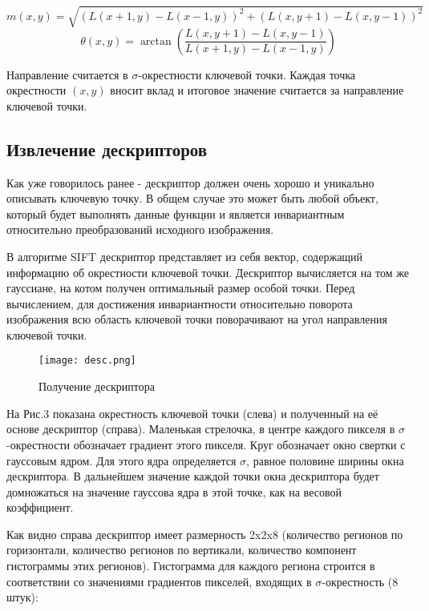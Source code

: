 \begin{equation}
    m(x,y)=\sqrt{(L(x+1,y) - L(x-1,y))^2 + (L(x,y+1) - L(x,y-1))^2}
\end{equation}
\begin{equation}
    \theta(x,y)=\arctan{\left(\frac{L(x,y+1) - L(x,y-1)}{L(x+1,y) - L(x-1,y)}\right)}
\end{equation}

Направление считается в $\sigma$-окрестности ключевой точки.  Каждая точка окрестности $(x, y)$ вносит вклад и итоговое значение считается за направление ключевой точки.

\subsection{Извлечение дескрипторов}

Как уже говорилось ранее - дескриптор должен очень хорошо и уникально описывать ключевую точку. В общем случае это может быть любой объект, который будет выполнять данные функции и является инвариантным относительно преобразований исходного изображения.

В алгоритме SIFT дескриптор представляет из себя вектор, содержащий информацию об окрестности ключевой точки. Дескриптор вычисляется на том же гауссиане, на котом получен оптимальный размер особой точки. Перед вычислением, для достижения инвариантности относительно поворота изображения всю область ключевой точки поворачивают на угол направления ключевой точки.

\begin{figure}[h]
    \centering
    \texttt{[image: desc.png]}
    \caption{Получение дескриптора}
    \label{fig:desc}
\end{figure}

На Рис.3 показана окрестность ключевой точки (слева) и полученный на её основе дескриптор (справа). Маленькая стрелочка, в центре каждого пикселя в $\sigma$-окрестности обозначает градиент этого пикселя. Круг обозначает окно свертки с гауссовым ядром. Для этого ядра определяется $\sigma$, равное половине ширины окна дескриптора. В дальнейшем значение каждой точки окна дескриптора будет домножаться на значение гауссова ядра в этой точке, как на весовой коэффициент.

Как видно справа дескриптор имеет размерность 2x2x8 (количество регионов по горизонтали, количество регионов по вертикали, количество компонент гистограммы этих регионов). Гистограмма для каждого региона строится в соответствии со значениями градиентов пикселей, входящих в  $\sigma$-окрестность (8 штук):

